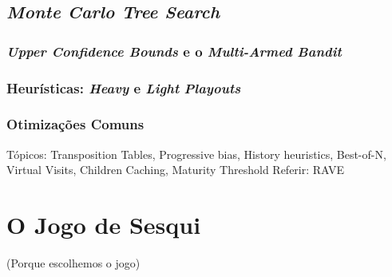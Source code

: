 \documentclass[12pt,a4paper,oneside]{article}
\begin{document}
\subsection{\textit{Monte Carlo Tree Search}}

\lipsum[1]

\lipsum[2]

\lipsum[3]

\subsubsection{\textit{Upper Confidence Bounds} e o \textit{Multi-Armed Bandit}}

\lipsum[1]

\lipsum[2]

\subsubsection{Heurísticas: \textit{Heavy} e \textit{Light} \textit{Playouts}}

\lipsum[1]

\lipsum[2]

\subsubsection{Otimizações Comuns}


Tópicos: Transposition Tables, Progressive bias, History heuristics, Best-of-N, Virtual Visits, Children Caching, Maturity Threshold
Referir: RAVE

\lipsum[1]

\lipsum[2]

\lipsum[3]

\lipsum[4]

\lipsum[5]



\section{O Jogo de Sesqui}
\label{sec:sesqui}

(Porque escolhemos o jogo)

\lipsum[1]
\end{document}
